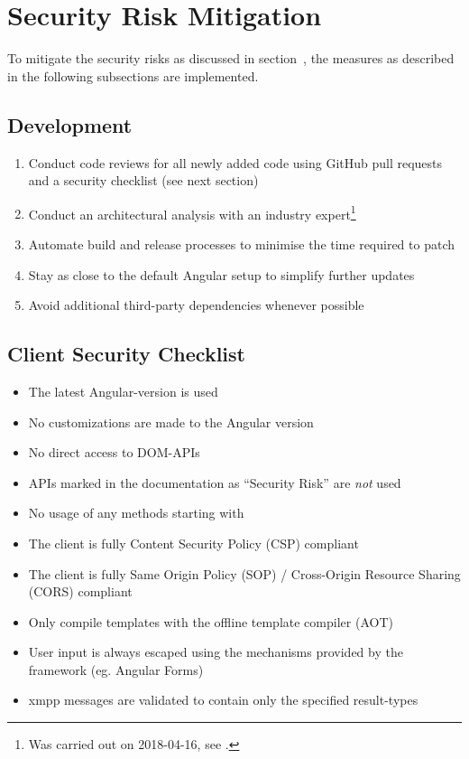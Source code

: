 \section{Security Risk Mitigation}\label{sec:security-risk-mitigation}

To mitigate the security risks as discussed in section~, the measures as described in the following subsections are implemented.

\subsection{Development}

\begin{enumerate}
    \item Conduct code reviews for all newly added code using GitHub pull requests and a security checklist (see next section)
    \item Conduct an architectural analysis with an industry expert\footnote{Was carried out on 2018-04-16, see .}
    \item Automate build and release processes to minimise the time required to patch
    \item Stay as close to the default Angular setup to simplify further updates
    \item Avoid additional third-party dependencies whenever possible
\end{enumerate}

\subsection{Client Security Checklist}
\begin{itemize}
    \item The latest Angular-version is used
    \item No customizations are made to the Angular version
    \item No direct access to DOM-APIs
    \item APIs marked in the documentation as ``Security Risk'' are \emph{not} used
    \item No usage of any methods starting with 
    \item The client is fully Content Security Policy (CSP) compliant
    \item The client is fully Same Origin Policy (SOP) / Cross-Origin Resource Sharing (CORS) compliant
    \item Only compile templates with the offline template compiler (AOT)
    \item User input is always escaped using the mechanisms provided by the framework (eg. Angular Forms)
    \item \gls{xmpp} messages are validated to contain only the specified result-types
\end{itemize}


